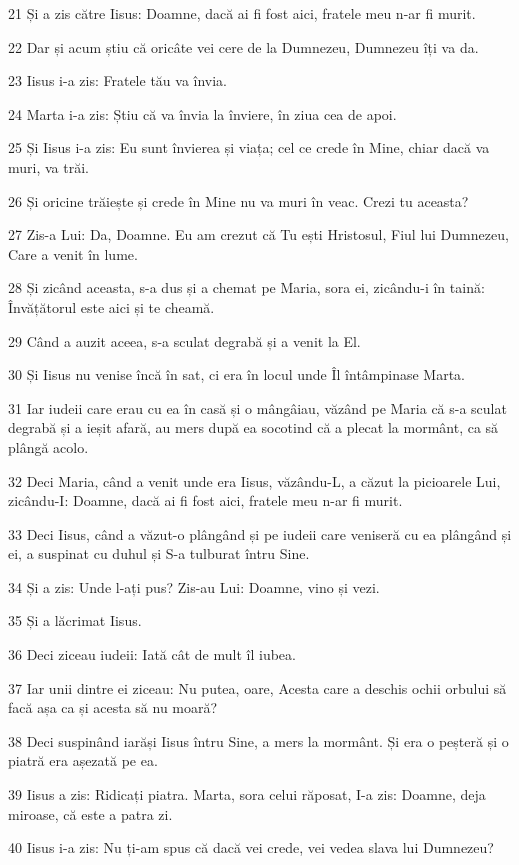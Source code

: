 \par 21 Și a zis către Iisus: Doamne, dacă ai fi fost aici, fratele meu n-ar fi murit.
\par 22 Dar și acum știu că oricâte vei cere de la Dumnezeu, Dumnezeu îți va da.
\par 23 Iisus i-a zis: Fratele tău va învia.
\par 24 Marta i-a zis: Știu că va învia la înviere, în ziua cea de apoi.
\par 25 Și Iisus i-a zis: Eu sunt învierea și viața; cel ce crede în Mine, chiar dacă va muri, va trăi.
\par 26 Și oricine trăiește și crede în Mine nu va muri în veac. Crezi tu aceasta?
\par 27 Zis-a Lui: Da, Doamne. Eu am crezut că Tu ești Hristosul, Fiul lui Dumnezeu, Care a venit în lume.
\par 28 Și zicând aceasta, s-a dus și a chemat pe Maria, sora ei, zicându-i în taină: Învățătorul este aici și te cheamă.
\par 29 Când a auzit aceea, s-a sculat degrabă și a venit la El.
\par 30 Și Iisus nu venise încă în sat, ci era în locul unde Îl întâmpinase Marta.
\par 31 Iar iudeii care erau cu ea în casă și o mângâiau, văzând pe Maria că s-a sculat degrabă și a ieșit afară, au mers după ea socotind că a plecat la mormânt, ca să plângă acolo.
\par 32 Deci Maria, când a venit unde era Iisus, văzându-L, a căzut la picioarele Lui, zicându-I: Doamne, dacă ai fi fost aici, fratele meu n-ar fi murit.
\par 33 Deci Iisus, când a văzut-o plângând și pe iudeii care veniseră cu ea plângând și ei, a suspinat cu duhul și S-a tulburat întru Sine.
\par 34 Și a zis: Unde l-ați pus? Zis-au Lui: Doamne, vino și vezi.
\par 35 Și a lăcrimat Iisus.
\par 36 Deci ziceau iudeii: Iată cât de mult îl iubea.
\par 37 Iar unii dintre ei ziceau: Nu putea, oare, Acesta care a deschis ochii orbului să facă așa ca și acesta să nu moară?
\par 38 Deci suspinând iarăși Iisus întru Sine, a mers la mormânt. Și era o peșteră și o piatră era așezată pe ea.
\par 39 Iisus a zis: Ridicați piatra. Marta, sora celui răposat, I-a zis: Doamne, deja miroase, că este a patra zi.
\par 40 Iisus i-a zis: Nu ți-am spus că dacă vei crede, vei vedea slava lui Dumnezeu?
